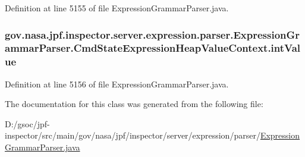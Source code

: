 Definition at line 5155 of file Expression\+Grammar\+Parser.\+java.

\subsubsection[{\texorpdfstring{int\+Value}{intValue}}]{ gov.\+nasa.\+jpf.\+inspector.\+server.\+expression.\+parser.\+Expression\+Grammar\+Parser.\+Cmd\+State\+Expression\+Heap\+Value\+Context.\+int\+Value}\hypertarget{classgov_1_1nasa_1_1jpf_1_1inspector_1_1server_1_1expression_1_1parser_1_1_expression_grammar_pa975e8909fcf76b653e93728b8bf729a1_a4927ad08643e4157c9184ed919bf3e7e}{}\label{classgov_1_1nasa_1_1jpf_1_1inspector_1_1server_1_1expression_1_1parser_1_1_expression_grammar_pa975e8909fcf76b653e93728b8bf729a1_a4927ad08643e4157c9184ed919bf3e7e}


Definition at line 5156 of file Expression\+Grammar\+Parser.\+java.



The documentation for this class was generated from the following file\+:\begin{DoxyCompactItemize}
\item 
D\+:/gsoc/jpf-\/inspector/src/main/gov/nasa/jpf/inspector/server/expression/parser/\hyperlink{_expression_grammar_parser_8java}{Expression\+Grammar\+Parser.\+java}\end{DoxyCompactItemize}
